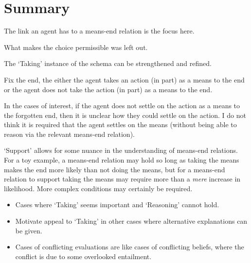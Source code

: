 \documentclass[10pt]{article}
\newcommand{\hand}{\ding{43}}
\newcommand{\hozlinedash}[0]{%
  \noindent\hdashrule[0.5ex][c]{\textwidth}{.1pt}{2.5pt}
}
\begin{document}
\newpage







\hozlinedash


\newpage

\section{Summary}
\label{sec:summary}


The link an agent has to a means-end relation is the focus here.

What makes the choice permissible was left out.

The `Taking' instance of the schema can be strengthened and refined.


Fix the end, the either the agent takes an action (in part) as a means to the end or the agent does not take the action (in part) as a means to the end.

In the cases of interest, if the agent does not settle on the action as a means to the forgotten end, then it is unclear how they could settle on the action.
I do not think it is required that the agent settles on the means (without being able to reason via the relevant means-end relation).


`Support' allows for some nuance in the understanding of means-end relations.
For a toy example, a means-end relation may hold so long as taking the means makes the end more likely than not doing the means, but for a means-end relation to support taking the means may require more than a \emph{mere} increase in likelihood.
More complex conditions may certainly be required.



\begin{itemize}
\item[\hand] Cases where `Taking' seems important and `Reasoning' cannot hold.
\item Motivate appeal to `Taking' in other cases where alternative explanations can be given.
\end{itemize}






\begin{itemize}
\item Cases of conflicting evaluations are like cases of conflicting beliefs, where the conflict is due to some overlooked entailment.
\end{itemize}
\end{document}
